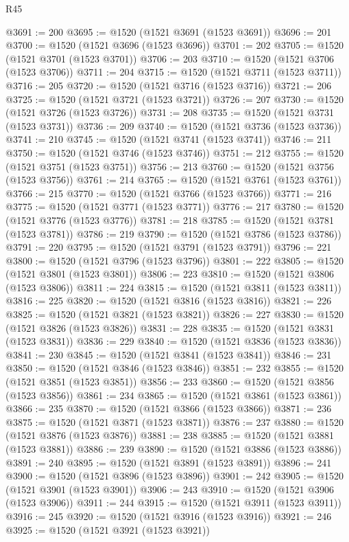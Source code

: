 \begin{lexlean}{R45}
\begin{coremodule}
{@3691 := 200
@3695 := @1520 (@1521 @3691 (@1523 @3691))
@3696 := 201
@3700 := @1520 (@1521 @3696 (@1523 @3696))
@3701 := 202
@3705 := @1520 (@1521 @3701 (@1523 @3701))
@3706 := 203
@3710 := @1520 (@1521 @3706 (@1523 @3706))
@3711 := 204
@3715 := @1520 (@1521 @3711 (@1523 @3711))
@3716 := 205
@3720 := @1520 (@1521 @3716 (@1523 @3716))
@3721 := 206
@3725 := @1520 (@1521 @3721 (@1523 @3721))
@3726 := 207
@3730 := @1520 (@1521 @3726 (@1523 @3726))
@3731 := 208
@3735 := @1520 (@1521 @3731 (@1523 @3731))
@3736 := 209
@3740 := @1520 (@1521 @3736 (@1523 @3736))
@3741 := 210
@3745 := @1520 (@1521 @3741 (@1523 @3741))
@3746 := 211
@3750 := @1520 (@1521 @3746 (@1523 @3746))
@3751 := 212
@3755 := @1520 (@1521 @3751 (@1523 @3751))
@3756 := 213
@3760 := @1520 (@1521 @3756 (@1523 @3756))
@3761 := 214
@3765 := @1520 (@1521 @3761 (@1523 @3761))
@3766 := 215
@3770 := @1520 (@1521 @3766 (@1523 @3766))
@3771 := 216
@3775 := @1520 (@1521 @3771 (@1523 @3771))
@3776 := 217
@3780 := @1520 (@1521 @3776 (@1523 @3776))
@3781 := 218
@3785 := @1520 (@1521 @3781 (@1523 @3781))
@3786 := 219
@3790 := @1520 (@1521 @3786 (@1523 @3786))
@3791 := 220
@3795 := @1520 (@1521 @3791 (@1523 @3791))
@3796 := 221
@3800 := @1520 (@1521 @3796 (@1523 @3796))
@3801 := 222
@3805 := @1520 (@1521 @3801 (@1523 @3801))
@3806 := 223
@3810 := @1520 (@1521 @3806 (@1523 @3806))
@3811 := 224
@3815 := @1520 (@1521 @3811 (@1523 @3811))
@3816 := 225
@3820 := @1520 (@1521 @3816 (@1523 @3816))
@3821 := 226
@3825 := @1520 (@1521 @3821 (@1523 @3821))
@3826 := 227
@3830 := @1520 (@1521 @3826 (@1523 @3826))
@3831 := 228
@3835 := @1520 (@1521 @3831 (@1523 @3831))
@3836 := 229
@3840 := @1520 (@1521 @3836 (@1523 @3836))
@3841 := 230
@3845 := @1520 (@1521 @3841 (@1523 @3841))
@3846 := 231
@3850 := @1520 (@1521 @3846 (@1523 @3846))
@3851 := 232
@3855 := @1520 (@1521 @3851 (@1523 @3851))
@3856 := 233
@3860 := @1520 (@1521 @3856 (@1523 @3856))
@3861 := 234
@3865 := @1520 (@1521 @3861 (@1523 @3861))
@3866 := 235
@3870 := @1520 (@1521 @3866 (@1523 @3866))
@3871 := 236
@3875 := @1520 (@1521 @3871 (@1523 @3871))
@3876 := 237
@3880 := @1520 (@1521 @3876 (@1523 @3876))
@3881 := 238
@3885 := @1520 (@1521 @3881 (@1523 @3881))
@3886 := 239
@3890 := @1520 (@1521 @3886 (@1523 @3886))
@3891 := 240
@3895 := @1520 (@1521 @3891 (@1523 @3891))
@3896 := 241
@3900 := @1520 (@1521 @3896 (@1523 @3896))
@3901 := 242
@3905 := @1520 (@1521 @3901 (@1523 @3901))
@3906 := 243
@3910 := @1520 (@1521 @3906 (@1523 @3906))
@3911 := 244
@3915 := @1520 (@1521 @3911 (@1523 @3911))
@3916 := 245
@3920 := @1520 (@1521 @3916 (@1523 @3916))
@3921 := 246
@3925 := @1520 (@1521 @3921 (@1523 @3921))
}
\end{coremodule}
\end{lexlean}
